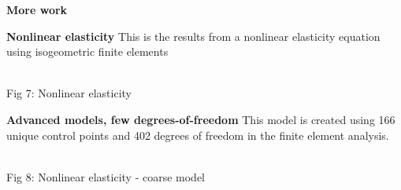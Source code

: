\documentclass[portrait,a0b,final]{a0poster}
\newenvironment{poster}{
  \begin{center}
  \begin{minipage}[c]{0.98\textwidth}
}{
  \end{minipage} 
  \end{center}
}
\begin{document}
\begin{poster}
\begin{multicols}{3}
    \begin{center} {\huge{\bf More work}} \end{center}
	\Large
	{\bf Nonlinear elasticity}
		This is the results from a nonlinear elasticity equation using isogeometric finite elements
		\begin{center}
			 \\
			\normalsize{Fig 7: Nonlinear elasticity}
		\end{center}

	{\bf Advanced models, few degrees-of-freedom}
		This model is created using 166 unique control points and 402 degrees of freedom in the finite element analysis.
		\begin{center}
			 \\
			\normalsize{Fig 8: Nonlinear elasticity - coarse model}
		\end{center}
		

\small{
    
    
}
\end{multicols}

\end{poster}
\end{document}
